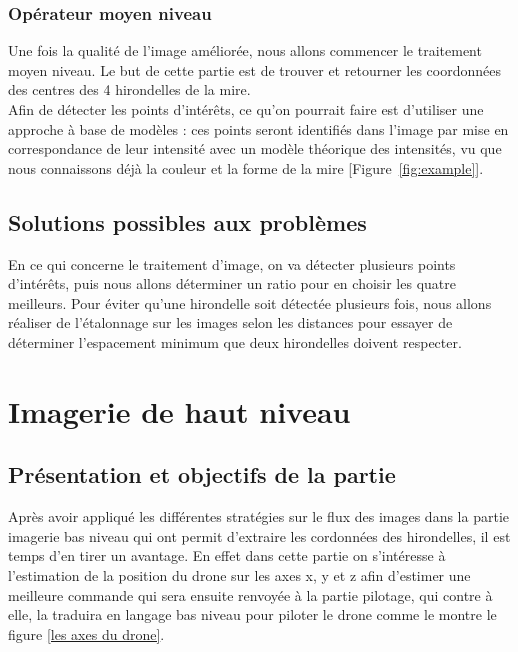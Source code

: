 \documentclass[12pt]{article}
\begin{document}
\subsubsection{Opérateur moyen niveau }
Une fois la qualité de l'image améliorée, nous allons commencer le traitement moyen niveau. Le but de cette partie est de trouver et retourner les coordonnées des centres des 4 hirondelles de la mire.\\
Afin de détecter les points d'intérêts, ce qu'on pourrait faire est d'utiliser une approche  à base de modèles : ces points seront identifiés dans l’image par mise en correspondance de leur intensité avec un modèle théorique des intensités, vu que nous connaissons déjà la couleur et la forme de la mire [Figure~\ref{fig:example}].\\

\subsection{Solutions possibles aux problèmes }
En ce qui concerne le traitement d'image, on va détecter plusieurs points d'intérêts, puis nous allons déterminer un ratio pour en choisir les quatre meilleurs.
Pour éviter qu'une hirondelle soit détectée plusieurs fois, nous allons réaliser de l'étalonnage sur les images selon les distances pour essayer de déterminer l'espacement minimum que deux hirondelles doivent respecter.


\section{Imagerie de haut niveau\label{haut}}
\subsection{Présentation et objectifs de la partie} 
Après avoir appliqué les différentes stratégies sur le flux des images dans la partie imagerie bas niveau qui ont permit d'extraire les cordonnées des hirondelles, il est temps d'en tirer un avantage. En effet dans cette partie on s'intéresse à l'estimation de la position du drone sur les axes x, y et z afin d'estimer une meilleure commande qui sera ensuite renvoyée à la partie pilotage, qui contre à elle, la traduira  en langage bas niveau pour piloter le drone comme le montre le figure \ref{les axes du drone}.\\ 
\end{document}
